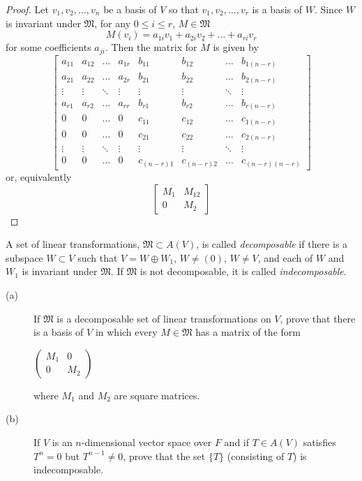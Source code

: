 \documentclass[12pt,leqno]{article}
\numberwithin{equation}{section}
\newcommand{\question}[2] {\vspace{.25in} \noindent\fbox{#1} #2 \vspace{.10in}}
\theoremstyle{definition}
\begin{document}
\begin{proof}
  Let $v_1,v_2,\hdots,v_n$ be a basis of $V$ so that $v_1,v_2,\hdots,v_r$ is a basis of $W$. Since $W$ is invariant under $\mathfrak{M}$, for any $0\leq i\leq r$, $M\in\mathfrak{M}$ \[M(v_i)=a_{1i}v_1+a_{2i}v_2+\hdots+a_{ri}v_r\] for some coefficients $a_{ji}$. Then the matrix for $M$ is given by \[\left[\begin{array}{cccc|cccc}a_{11}&a_{12}&\hdots&a_{1r}&b_{11}&b_{12}&\hdots&b_{1(n-r)}\\a_{21}&a_{22}&\hdots&a_{2r}&b_{21}&b_{22}&\hdots&b_{2(n-r)}\\\vdots&\vdots&\ddots&\vdots&\vdots&\vdots&\ddots&\vdots\\a_{r1}&a_{r2}&\hdots&a_{rr}&b_{r1}&b_{r2}&\hdots&b_{r(n-r)}\\\hline0&0&\hdots&0&c_{11}&c_{12}&\hdots&c_{1(n-r)}\\0&0&\hdots&0&c_{21}&c_{22}&\hdots&c_{2(n-r)}\\\vdots&\vdots&\ddots&\vdots&\vdots&\vdots&\ddots&\vdots\\0&0&\hdots&0&c_{(n-r)1}&c_{(n-r)2}&\hdots&c_{(n-r)(n-r)}\end{array}\right]\] or, equivalently \[\left[\begin{array}{c|c}M_1&M_{12}\\\hline0&M_{2}\end{array}\right]\]
\end{proof}

\question{16}{A set of linear transformations, $\mathfrak{M}\subset A(V)$, is called \textit{decomposable} if there is a subspace $W\subset V$ such that $V=W\oplus W_1$, $W\not=(0)$, $W\not=V$, and each of $W$ and $W_1$ is invariant under $\mathfrak{M}$. If $\mathfrak{M}$ is not decomposable, it is called \textit{indecomposable}.}
\begin{description}
 \item [(a)] If $\mathfrak{M}$ is a decomposable set of linear transformations on $V$, prove that there is a basis of $V$ in which every $M\in\mathfrak{M}$ has a matrix of the form \begin{center}$\left(\begin{array}{c|c}M_1&0\\\hline 0&M_2\end{array}\right)$\end{center} where $M_1$ and $M_2$ are square matrices.
 \item [(b)] If $V$ is an $n$-dimensional vector space over $F$ and if $T\in A(V)$ satisfies $T^n=0$ but $T^{n-1}\not=0$, prove that the set $\{T\}$ (consisting of $T$) is indecomposable.
\end{description}
\end{document}

